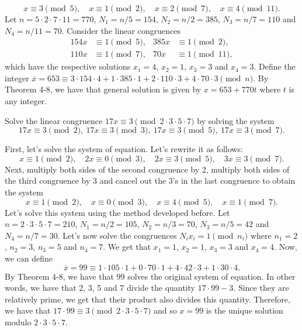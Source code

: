 \begin{solution}
\begin{enumerate}
        $$x \equiv 3 \pmod 5, \quad x \equiv 1 \pmod 2, \quad x \equiv 2 \pmod 7, \quad x \equiv 4 \pmod{11}.$$
        Let $n = 5 \cdot 2 \cdot 7 \cdot 11 = 770$, $N_1 = n / 5 = 154$, $N_2 = n / 2 = 385$, $N_3 = n / 7 = 110$ and $N_4 = n / 11 = 70$. Consider the linear congruences
        \begin{align*}
            154x &\equiv 1 \pmod{5}, &385x &\equiv 1 \pmod{2}, \\
            110x &\equiv 1 \pmod{7}, &70x &\equiv 1 \pmod{11},
        \end{align*} 
        which have the respective solutions $x_1 = 4$, $x_2 = 1$, $x_3 = 3$ and $x_4 = 3$. Define the integer $\overline{x} = 653 \equiv 3\cdot 154 \cdot 4 + 1\cdot 385 \cdot 1 + 2\cdot 110 \cdot 3 + 4 \cdot 70 \cdot 3 \pmod{n}$. By Theorem 4-8, we have that general solution is given by $x = 653 + 770t$ where $t$ is any integer. \\
    \end{enumerate}
\end{solution}

\begin{exercise}
    Solve the linear congruence $17x \equiv 3 \pmod{2\cdot 3\cdot 5 \cdot 7}$ by solving the system
    $$17x \equiv 3 \pmod 2, \ 17x \equiv 3 \pmod 3, \ 17x \equiv 3 \pmod 5, \ 17x \equiv 3 \pmod 7.$$
\end{exercise}

\begin{solution}
    First, let's solve the system of equation. Let's rewrite it as follows:
    $$x \equiv 1 \pmod 2, \quad 2x \equiv 0 \pmod 3, \quad 2x \equiv 3 \pmod 5, \quad 3x \equiv 3 \pmod 7.$$
    Next, multiply both sides of the second congruence by 2, multiply both sides of the third congruence by 3 and cancel out the 3's in the last congruence to obtain the system
    $$x \equiv 1 \pmod 2, \quad x \equiv 0 \pmod 3, \quad x \equiv 4 \pmod 5, \quad x \equiv 1 \pmod 7.$$
    Let's solve this system using the method developed before. Let $n = 2 \cdot 3 \cdot 5 \cdot 7 = 210$, $N_1 = n / 2 = 105$, $N_2 = n / 3 = 70$, $N_3 = n / 5 = 42$ and $N_4 = n / 7 = 30$. Let's now solve the congruences $N_i x_i = 1 \pmod{n_i}$ where $n_1 = 2$, $n_2 = 3$, $n_3 = 5$ and $n_4 = 7$. We get that $x_1 = 1$, $x_2 = 1$, $x_3 = 3$ and $x_4 = 4$. Now, we can define
    $$\overline{x} = 99 \equiv 1 \cdot 105 \cdot 1 + 0 \cdot 70 \cdot 1 + 4 \cdot 42 \cdot 3 + 1 \cdot 30 \cdot 4.$$
    By Theorem 4-8, we have that 99 solves the original system of equation. In other words, we have that 2, 3, 5 and 7 divide the quantity $17\cdot 99 - 3$. Since they are relatively prime, we get that their product also divides this quantity. Therefore, we have that $17 \cdot 99 \equiv 3 \pmod{2 \cdot 3 \cdot 5 \cdot 7}$ and so $x = 99$ is the unique solution modulo $2 \cdot 3 \cdot 5 \cdot 7$. \\
\end{solution}

